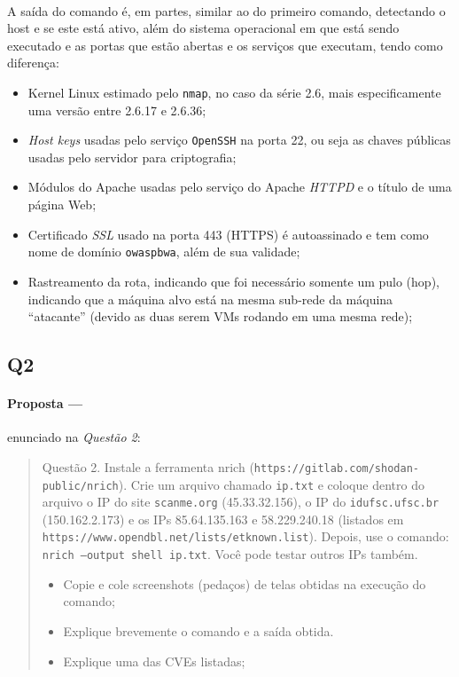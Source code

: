 \documentclass[12pt]{article}
\begin{document}
\paragraph{}
A saída do comando é, em partes, similar ao do primeiro comando, detectando o host e se este está ativo, além do sistema operacional em que está sendo executado e as portas que estão abertas e os serviços que executam, tendo como diferença:
\begin{itemize}
  \item Kernel Linux estimado pelo \texttt{nmap}, no caso da série 2.6, mais especificamente uma versão entre 2.6.17 e 2.6.36;
  \item \textit{Host keys} usadas pelo serviço \texttt{OpenSSH} na porta 22, ou seja as chaves públicas usadas pelo servidor para
    criptografia;
  \item Módulos do Apache usadas pelo serviço do Apache \textit{HTTPD} e o título de uma página Web;
  \item Certificado \textit{SSL} usado na porta 443 (HTTPS) é autoassinado e tem como nome de domínio \texttt{owaspbwa}, além de sua
    validade;
  \item Rastreamento da rota, indicando que foi necessário somente um pulo (hop), indicando que a máquina alvo está na
    mesma sub-rede da máquina “atacante” (devido as duas serem VMs rodando em uma mesma rede);
\end{itemize}

\subsection{Q2}

\paragraph{Proposta ---} enunciado na \textit{Questão 2}:

\begin{quote}
  Questão 2. Instale a ferramenta nrich (\texttt{https://gitlab.com/shodan-public/nrich}). Crie um arquivo chamado
  \texttt{ip.txt} e coloque dentro do arquivo o IP do site \texttt{scanme.org} (45.33.32.156), o IP do
  \texttt{idufsc.ufsc.br} (150.162.2.173) e os IPs 85.64.135.163 e 58.229.240.18 (listados em
  \texttt{https://www.opendbl.net/lists/etknown.list}). Depois, use o comando: \texttt{nrich --output shell ip.txt}. Você pode testar outros IPs também. 
  \begin{itemize}
    \item Copie e cole screenshots (pedaços) de telas obtidas na execução do comando;
    \item Explique brevemente o comando e a saída obtida. 
    \item Explique uma das CVEs listadas;
  \end{itemize}
\end{quote}
\end{document}
